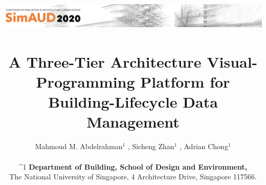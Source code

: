 \documentclass{scsSimAUDPaperFormat}
\newcommand{\affiliation}[1]{\ensuremath{^{\textrm{#1}}}}
\begin{document}

\title{\includegraphics[width=1.0\textwidth]{SimAUDLogo.png}\\\quad\\A Three-Tier Architecture Visual-Programming Platform for Building-Lifecycle Data Management }

\def\UniversityA{\affiliation{1}} 
\def\CompanyA{\affiliation{2}}
\def\UniversityB{\affiliation{3}}

\author{
}


\author{
	Mahmoud M. Abdelrahman\UniversityA
	,
	Sicheng Zhan\UniversityA
	,
	Adrian Chong\UniversityA
	\\
{\\^1 \textbf{\large Department of Building, School of Design and Environment,}\\The National University of Singapore, 4 Architecture Drive, Singapore 117566.}\\
}

\maketitle
\end{document}

